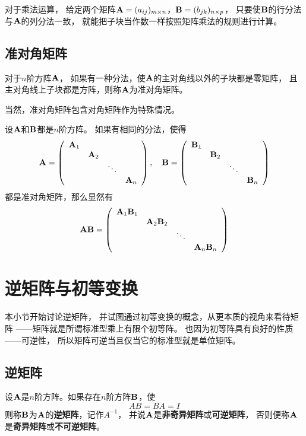 对于乘法运算，
给定两个矩阵$\mmA=(a_{ij})_{m\times n}$，$\mmB=(b_{jk})_{n\times p}$，
只要使$\mmB$的行分法与$\mmA$的列分法一致，
就能把子块当作数一样按照矩阵乘法的规则进行计算。

\subsection{准对角矩阵}
\begin{definition}[准对角矩阵] 
  对于$n$阶方阵$\mmA$，
  如果有一种分法，使$\mmA$的主对角线以外的子块都是零矩阵，
  且主对角线上子块都是方阵，则称$\mmA$为准对角矩阵。
\end{definition}

\begin{remark}
  当然，准对角矩阵包含对角矩阵作为特殊情况。
\end{remark}

设$\mmA$和$\mmB$都是$n$阶方阵。
如果有相同的分法，使得
\[
\mmA = \mmat{cccc}{
  \mmA_1 &        &        & \\
         & \mmA_2 &        & \\
         &        & \ddots & \\
         &        &        & \mmA_n },\quad
\mmB = \mmat{cccc}{
  \mmB_1 &        &        & \\
         & \mmB_2 &        & \\
         &        & \ddots & \\
         &        &        & \mmB_n }
\]
都是准对角矩阵，那么显然有
\[
\mmA\mmB = \mmat{cccc}{
    \mmA_1\mmB_1 &              &        & \\
                 & \mmA_2\mmB_2 &        & \\
                 &              & \ddots & \\
                 &              &        & \mmA_n\mmB_n }
\]

\section{逆矩阵与初等变换}
本小节开始讨论逆矩阵，
并试图通过初等变换的概念，从更本质的视角来看待矩阵
——矩阵就是所谓标准型乘上有限个初等阵。
也因为初等阵具有良好的性质——可逆性，
所以矩阵可逆当且仅当它的标准型就是单位矩阵。

\subsection{逆矩阵}
\begin{definition}[逆矩阵]
  设$\mmA$是$n$阶方阵。如果存在$n$阶方阵$\mmB$，使
  \begin{equation}
    AB=BA=I
  \end{equation}
  则称$\mmB$为$\mmA$的\textbf{逆矩阵}，记作$A^{-1}$，
  并说$\mmA$是\textbf{非奇异矩阵}或\textbf{可逆矩阵}，
  否则便称$\mmA$是\textbf{奇异矩阵}或\textbf{不可逆矩阵}。
\end{definition}

